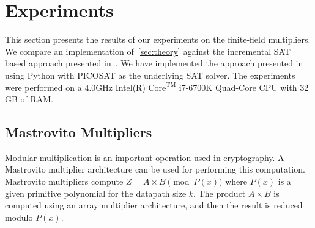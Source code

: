 \section{Experiments}
\label{sec:exp}

This section presents the results of our experiments on the finite-field multipliers.
We compare an implementation of~\autoref{sec:theory}  
against the incremental SAT based approach presented in~\cite{fujita:2015}.
We have implemented the approach presented in~\cite{fujita:2015} using
Python with PICOSAT as the underlying SAT solver. The experiments were performed on a 4.0GHz 
Intel(R) $\text{Core}^{\text{TM}}$ i7-6700K Quad-Core CPU with 32 GB of RAM.
\subsection{Mastrovito Multipliers}
Modular multiplication is an important operation used in cryptography. 
A Mastrovito multiplier architecture can be used for performing this computation.
Mastrovito multipliers compute $Z = A\times B \pmod{P(x)}$ where $P(x)$ is a given primitive polynomial for the datapath size
$k$. The product $A \times B$ is computed using an array multiplier architecture, and then the result is reduced modulo $P(x)$.
